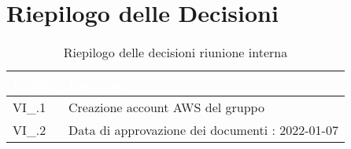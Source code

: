 \section{Riepilogo delle Decisioni}


\begin{table}[!htbp]
\renewcommand{\arraystretch}{1.5}
\begin{tabular}{m{}<{\centering}  m{}<{\centering}}
\rowcolor{darkblue} \textcolor{white}{\textbf{Codice}} & \textcolor{white}{\textbf{Decisione}} \\
\hline
VI\_\D{}.1 & Creazione account AWS del gruppo\\
\rowcolor{gray!25} VI\_\D{}.2 & Data di approvazione dei documenti : 2022-01-07\\
\end{tabular}
\caption{Riepilogo delle decisioni riunione interna \D{}}
\end{table}